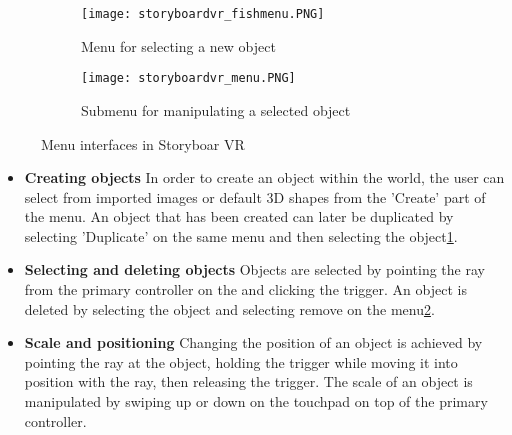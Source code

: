 \begin{figure}
\begin{subfigure}{.5\textwidth}
  \centering
  \texttt{[image: storyboardvr\_fishmenu.PNG]}
  \caption{Menu for selecting a new object}
  \label{fig:storyboard:fishmenu}
\end{subfigure}%
\begin{subfigure}{.5\textwidth}
  \centering
  \texttt{[image: storyboardvr\_menu.PNG]}
  \caption{Submenu for manipulating a selected object}
  \label{fig:storyboard:menu}
\end{subfigure}
\caption{Menu interfaces in Storyboar VR}
\label{fig:storyboard}
\end{figure}
\begin{itemize}


\item \textbf{Creating objects}
In order to create an object within the world, the user can select from imported images or default 3D shapes from the 'Create' part of the menu. An object that has been created can later be duplicated by selecting 'Duplicate' on the same menu and then selecting the object\ref{fig:storyboard:fishmenu}.
\item \textbf{Selecting and deleting objects}
Objects are selected by pointing the ray from the primary controller on the and clicking the trigger. An object is deleted by selecting the object and selecting remove on the menu\ref{fig:storyboard:menu}.
\item \textbf{Scale and positioning}
Changing the position of an object is achieved by pointing the ray at the object, holding the trigger while moving it into position with the ray, then releasing the trigger. The scale of an object is manipulated by  swiping up or down on the touchpad on top of the primary controller.
\end{itemize}
